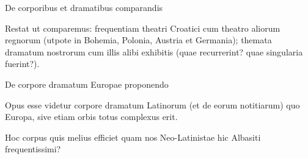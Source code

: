 \documentclass[14pt]{beamer}
\begin{document}
\begin{frame}{De corporibus et dramatibus comparandis}

  Restat ut comparemus: \alert{frequentiam} theatri Croatici cum
  theatro aliorum regnorum (utpote in Bohemia, Polonia, Austria et
  Germania); \alert{themata} dramatum nostrorum cum illis alibi
  exhibitis (quae recurrerint? quae singularia fuerint?).
  
\end{frame}

\begin{frame}{De corpore dramatum Europae proponendo}
  
  Opus esse videtur corpore dramatum Latinorum (et de eorum notitiarum) quo \alert{Europa, sive etiam orbis totus} complexus erit.
  
\end{frame}



\begin{frame}[standout]
  Hoc corpus quis melius efficiet quam \alert{nos Neo-Latinistae hic Albasiti frequentissimi}?
  
\end{frame}

  \maketitle
\end{document}
